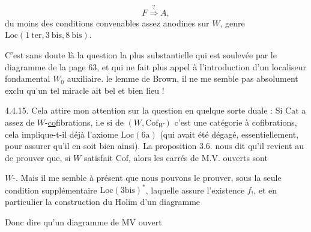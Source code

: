 \[
 F\overset{?}{\Longrightarrow} A,
\]
du moins  des conditions convenables assez anodines sur $W$, genre $\mathrm{Loc}(1\ \mathrm{ter},3\ \mathrm{bis},8\ \mathrm{bis})$.

C'est sans doute là la question la plus substantielle  qui est soulevée par le diagramme de la page 63, et qui ne fait plus appel à l'introduction d'un localiseur fondamental $W_0$ auxiliaire.  le lemme de Brown, il ne me semble pas absolument exclu qu'un tel miracle ait bel et bien lieu !

4.4.15.  Cela attire mon attention sur la question en quelque sorte duale : Si $\mathrm{Cat}$ a assez de $W$-\uline{co}fibrations, i.e si  de $(W,\mathrm{Cof}_W)$ c'est une catégorie à cofibrations, cela implique-t-il déjà l'axiome $\mathrm{Loc}(6\mathrm a)$ (qui avait été dégagé, essentiellement, pour assurer qu'il en soit bien ainsi). La proposition 3.6.  nous dit qu'il revient au  de prouver que, si $W$ satisfait $\mathrm{Cof}$, alors les carrés de M.V. ouverts sont

 $W$-.  Mais il me semble à présent que nous pouvons le prouver,  sous la seule condition supplémentaire  $\mathrm{Loc}(3\mathrm{bis})^{*}$,
laquelle assure l'existence  $f_!$, et en particulier la construction du  $\mathrm{Holim}$ d'un diagramme

Donc dire qu'un diagramme de MV ouvert

